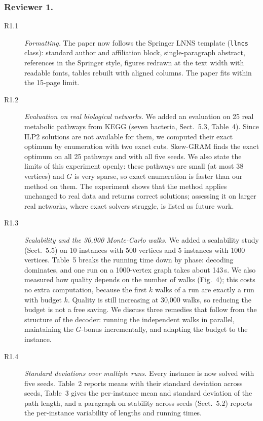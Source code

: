 \documentclass{llncs}
\begin{document}
\subsubsection{Reviewer 1.}

\begin{description}
\item[R1.1] \emph{Formatting.} The paper now follows the Springer LNNS template (\texttt{llncs} class): standard author and affiliation block, single-paragraph abstract, references in the Springer style, figures redrawn at the text width with readable fonts, tables rebuilt with aligned columns. The paper fits within the 15-page limit.

\item[R1.2] \emph{Evaluation on real biological networks.} We added an evaluation on 25 real metabolic pathways from KEGG (seven bacteria, Sect.~5.3, Table~4). Since ILP2 solutions are not available for them, we computed their exact optimum by enumeration with two exact cuts. Skew-GRAM finds the exact optimum on all 25 pathways and with all five seeds. We also state the limits of this experiment openly: these pathways are small (at most 38 vertices) and $G$ is very sparse, so exact enumeration is faster than our method on them. The experiment shows that the method applies unchanged to real data and returns correct solutions; assessing it on larger real networks, where exact solvers struggle, is listed as future work.

\item[R1.3] \emph{Scalability and the 30,000 Monte-Carlo walks.} We added a scalability study (Sect.~5.5) on 10 instances with 500 vertices and 5 instances with 1000 vertices. Table~5 breaks the running time down by phase: decoding dominates, and one run on a 1000-vertex graph takes about 143\,s. We also measured how quality depends on the number of walks (Fig.~4); this costs no extra computation, because the first $k$ walks of a run are exactly a run with budget $k$. Quality is still increasing at 30,000 walks, so reducing the budget is not a free saving. We discuss three remedies that follow from the structure of the decoder: running the independent walks in parallel, maintaining the $G$-bonus incrementally, and adapting the budget to the instance.

\item[R1.4] \emph{Standard deviations over multiple runs.} Every instance is now solved with five seeds. Table~2 reports means with their standard deviation across seeds, Table~3 gives the per-instance mean and standard deviation of the path length, and a paragraph on stability across seeds (Sect.~5.2) reports the per-instance variability of lengths and running times.
\end{description}
\end{document}
